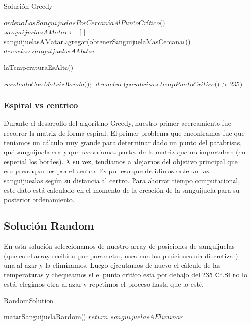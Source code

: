 \begin{algorithm}
\caption{Solución Greedy}\label{euclid}
\begin{algorithmic}[1]
\State $\textit{ordenoLasSanguijuelasPorCercaníaAlPuntoCrítico() }$
\State $\textit{sanguijuelasAMatar} \gets []$
\Do
    \State sanguijuelasAMatar.agregar(obtenerSanguijuelaMasCercana())
\State $\textit{devuelvo sanguijuelasAMatar}$
\end{algorithmic}
\end{algorithm}

\begin{algorithm}
\caption{laTemperaturaEsAlta()}\label{euclid}
\begin{algorithmic}[1]
\State $\textit{recalculoConMatrizBanda();}$
\State $\textit{devuelvo (parabrisas.tempPuntoCritico() $>$ 235)}$
\end{algorithmic}
\end{algorithm}


\subsubsection{Espiral vs centrico}
	Durante el desarrollo del algoritmo Greedy, nuestro primer acercamiento fue recorrer la matriz de forma espiral. El primer problema que encontramos fue que teníamos un cálculo muy grande para determinar dado un punto del parabrisas, qué sanguijuela era y que recorríamos partes de la matriz que no importaban (en especial los bordes). A su vez, tendíamos a alejarnos del objetivo principal que era preocuparnos por el centro. Es por eso que decidimos ordenar las sanguijuealas según su distancia al centro. Para ahorrar tiempo computacional, este dato está calculado en el momento de la creación de la sanguijuela para su posterior ordenamiento.

\subsection{Solución Random}\label{sec:solucionRandom}
En esta solución seleccionamos de nuestro array de posiciones de sanguijuelas (que es el array recibido por parametro, osea con las posiciones sin discretizar) una al azar y la eliminamos. Luego ejecutamos de nuevo el cálculo de las temperaturas y chequeamos si el punto crìtico esta por debajo del 235 Cº.Si no lo está, elegimos otra al azar y repetimos el proceso hasta que lo esté. 

\begin{algorithm}
\caption{RandomSolution}\label{euclid}
\begin{algorithmic}[1]
\Do
    \State matarSanguijuelaRandom()
\State $\textit{return sanguijuelasAEliminar}$
\end{algorithmic}
\end{algorithm}

